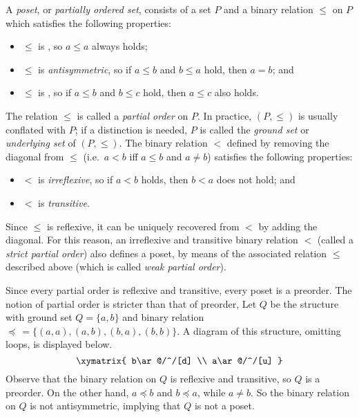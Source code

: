\documentclass[12pt]{article}
\theoremstyle{definition}
\begin{document}

A \emph{poset}, or \emph{partially ordered set}, consists of a set $P$
and a binary relation $\le$ on $P$ which satisfies the following
properties:
\begin{itemize}
\item
$\le$ is , so $a\le a$ always
holds;

\item
$\le$ is \emph{antisymmetric}, so if $a\le b$ and $b\le a$ hold, then
$a=b$; and

\item
$\le$ is , so if $a\le b$
and $b\le c$ hold, then $a\le c$ also holds.

\end{itemize}

The relation $\le$ is called a \emph{partial order} on $P$.  In
practice, $(P,\le)$ is usually conflated with $P$; if a distinction is
needed, $P$ is called the \emph{ground set} or \emph{underlying set} of $(P,\le)$.  
The binary relation $<$ defined by removing the diagonal from $\le$ 
(i.e.\, $a<b$ iff $a\leq b$ and $a\neq b$) satisfies the following properties:
\begin{itemize}
\item
$<$ is \emph{irreflexive}, so if $a<b$ holds, then $b<a$ does not
hold; and

\item
$<$ is \emph{transitive}.
\end{itemize}
Since $\le$ is reflexive, it can be uniquely recovered from $<$ by adding 
the diagonal.  For this reason, an irreflexive and transitive binary
relation $<$ (called a \emph{strict partial order}) also defines a poset, by means
of the associated relation $\le$ described above (which is called \emph{weak partial order}).

Since every partial order is reflexive and transitive, every poset is
a preorder.  The notion of partial order is stricter than that of
preorder, Let $Q$ be the structure with ground set $Q=\{a,b\}$ and
binary relation $\preceq\, = \{(a,a),(a,b),(b,a),(b,b)\}$.  A diagram
of this structure, omitting loops, is displayed below.
\[\xymatrix{
b\ar@/^/[d] \\
a\ar@/^/[u]
}\]
Observe that the binary relation on $Q$ is reflexive and transitive,
so $Q$ is a preorder.  On the other hand, $a\preceq b$ and $b\preceq
a$, while $a\ne b$.  So the binary relation on $Q$ is not
antisymmetric, implying that $Q$ is not a poset.
\end{document}
